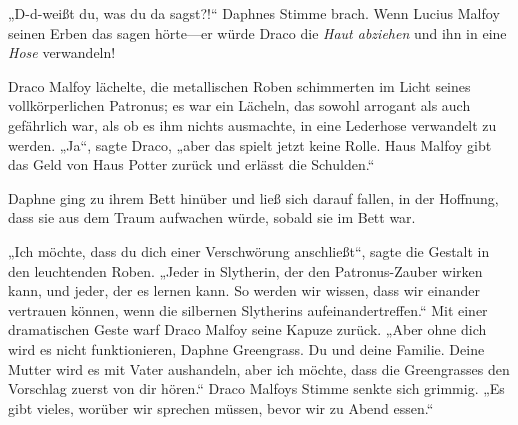 „D-d-weißt du, was du da sagst?!“ Daphnes Stimme brach.
Wenn Lucius Malfoy seinen Erben das sagen hörte—er würde Draco die \emph{Haut abziehen} und ihn in eine \emph{Hose} verwandeln!

Draco Malfoy lächelte, die metallischen Roben schimmerten im Licht seines vollkörperlichen Patronus; es war ein Lächeln, das sowohl arrogant als auch gefährlich war, als ob es ihm nichts ausmachte, in eine Lederhose verwandelt zu werden.
„Ja“, sagte Draco, „aber das spielt jetzt keine Rolle. Haus Malfoy gibt das Geld von Haus Potter zurück und erlässt die Schulden.“

Daphne ging zu ihrem Bett hinüber und ließ sich darauf fallen, in der Hoffnung, dass sie aus dem Traum aufwachen würde, sobald sie im Bett war.

„Ich möchte, dass du dich einer Verschwörung anschließt“, sagte die Gestalt in den leuchtenden Roben. „Jeder in Slytherin, der den Patronus-Zauber wirken kann, und jeder, der es lernen kann. So werden wir wissen, dass wir einander vertrauen können, wenn die silbernen Slytherins aufeinandertreffen.“
Mit einer dramatischen Geste warf Draco Malfoy seine Kapuze zurück.
„Aber ohne dich wird es nicht funktionieren, Daphne Greengrass. Du und deine Familie. Deine Mutter wird es mit Vater aushandeln, aber ich möchte, dass die Greengrasses den Vorschlag zuerst von dir hören.“
Draco Malfoys Stimme senkte sich grimmig.
„Es gibt vieles, worüber wir sprechen müssen, bevor wir zu Abend essen.“

